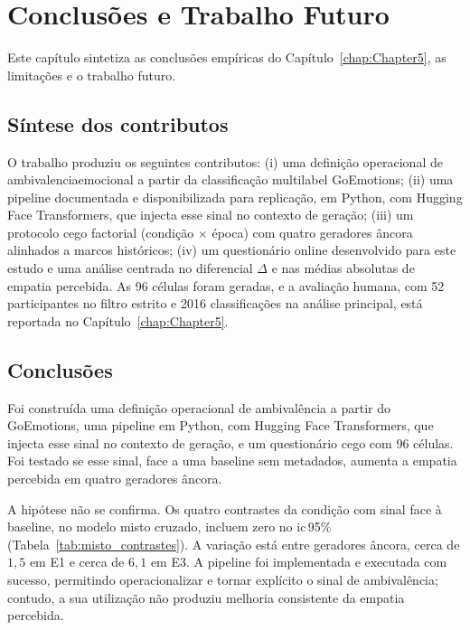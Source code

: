
\chapter{Conclusões e Trabalho Futuro}
\label{chap:Chapter6}

Este capítulo sintetiza as conclusões empíricas do Capítulo~\ref{chap:Chapter5}, as limitações e o trabalho futuro.


\section{Síntese dos contributos}
\label{sec:conc_contributos}

O trabalho produziu os seguintes contributos: (i) uma definição operacional de \gls{ambivalenciaemocional} a partir da classificação multilabel GoEmotions; (ii) uma \gls{pipeline} documentada e disponibilizada para replicação, em Python, com Hugging Face Transformers, que injecta esse sinal no contexto de geração; (iii) um protocolo cego factorial (condição \(\times\) época) com quatro geradores âncora alinhados a marcos históricos; (iv) um questionário online desenvolvido para este estudo e uma análise centrada no diferencial \(\Delta\) e nas médias absolutas de empatia percebida. As 96 células foram geradas, e a avaliação humana, com 52 participantes no filtro estrito e 2016 classificações na análise principal, está reportada no Capítulo~\ref{chap:Chapter5}.


\section{Conclusões}
\label{sec:conc_conclusoes}

Foi construída uma definição operacional de ambivalência a partir do GoEmotions, uma pipeline em Python, com Hugging Face Transformers, que injecta esse sinal no contexto de geração, e um questionário cego com 96 células. Foi testado se esse sinal, face a uma \gls{baseline} sem metadados, aumenta a empatia percebida em quatro geradores âncora.

A hipótese não se confirma. Os quatro contrastes da condição com sinal face à baseline, no modelo misto cruzado, incluem zero no \gls{ic}\,95\% (Tabela~\ref{tab:misto_contrastes}). A variação está entre geradores âncora, cerca de \(1{,}5\) em E1 e cerca de \(6{,}1\) em E3. A pipeline foi implementada e executada com sucesso, permitindo operacionalizar e tornar explícito o sinal de ambivalência; contudo, a sua utilização não produziu melhoria consistente da empatia percebida.

